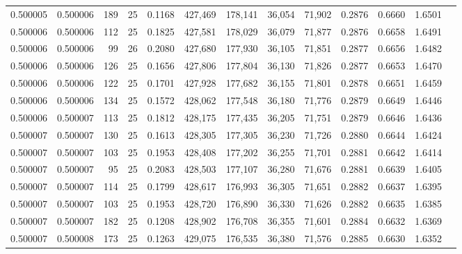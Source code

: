 \begin{tabular}{rrrrrrrrrrrrr}
0.500005 & 0.500006 &   189 &  25 &                                     0.1168 & 427,469 & 178,141 &  36,054 &  71,902 & 0.2876 & 0.6660 & 1.6501 \\
0.500006 & 0.500006 &   112 &  25 &                                     0.1825 & 427,581 & 178,029 &  36,079 &  71,877 & 0.2876 & 0.6658 & 1.6491 \\
0.500006 & 0.500006 &    99 &  26 &                                     0.2080 & 427,680 & 177,930 &  36,105 &  71,851 & 0.2877 & 0.6656 & 1.6482 \\
0.500006 & 0.500006 &   126 &  25 &                                     0.1656 & 427,806 & 177,804 &  36,130 &  71,826 & 0.2877 & 0.6653 & 1.6470 \\
0.500006 & 0.500006 &   122 &  25 &                                     0.1701 & 427,928 & 177,682 &  36,155 &  71,801 & 0.2878 & 0.6651 & 1.6459 \\
0.500006 & 0.500006 &   134 &  25 &                                     0.1572 & 428,062 & 177,548 &  36,180 &  71,776 & 0.2879 & 0.6649 & 1.6446 \\
0.500006 & 0.500007 &   113 &  25 &                                     0.1812 & 428,175 & 177,435 &  36,205 &  71,751 & 0.2879 & 0.6646 & 1.6436 \\
0.500007 & 0.500007 &   130 &  25 &                                     0.1613 & 428,305 & 177,305 &  36,230 &  71,726 & 0.2880 & 0.6644 & 1.6424 \\
0.500007 & 0.500007 &   103 &  25 &                                     0.1953 & 428,408 & 177,202 &  36,255 &  71,701 & 0.2881 & 0.6642 & 1.6414 \\
0.500007 & 0.500007 &    95 &  25 &                                     0.2083 & 428,503 & 177,107 &  36,280 &  71,676 & 0.2881 & 0.6639 & 1.6405 \\
0.500007 & 0.500007 &   114 &  25 &                                     0.1799 & 428,617 & 176,993 &  36,305 &  71,651 & 0.2882 & 0.6637 & 1.6395 \\
0.500007 & 0.500007 &   103 &  25 &                                     0.1953 & 428,720 & 176,890 &  36,330 &  71,626 & 0.2882 & 0.6635 & 1.6385 \\
0.500007 & 0.500007 &   182 &  25 &                                     0.1208 & 428,902 & 176,708 &  36,355 &  71,601 & 0.2884 & 0.6632 & 1.6369 \\
0.500007 & 0.500008 &   173 &  25 &                                     0.1263 & 429,075 & 176,535 &  36,380 &  71,576 & 0.2885 & 0.6630 & 1.6352 \\

\end{tabular}
